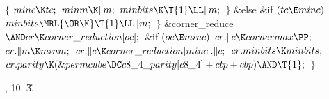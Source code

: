 ${}\{{}$\1\6
${}\\{minc}\K\\{tc};{}$\6
${}\\{minm}\K\|m;{}$\6
${}\\{minbits}\K\T{1}\LL\|m;{}$\6
\4${}\}{}$\2\6
\&{else} \&{if} ${}(\\{tc}\E\\{minc}){}$\1\5
${}\\{minbits}\MRL{{\OR}{\K}}\T{1}\LL\|m;{}$\2\6
\4${}\}{}$\2\7
\&{corner\_reduce} ${}{\AND}\\{cr}\K\\{corner\_reduction}[\\{oc}];{}$\7
\&{if} ${}(\\{oc}\E\\{minc}){}$\1\5
${}\\{cr}.\|c\K\\{cornermax}\PP;{}$\2\6
${}\\{cr}.\|m\K\\{minm};{}$\6
${}\\{cr}.\|c\K\\{corner\_reduction}[\\{minc}].\|c;{}$\6
${}\\{cr}.\\{minbits}\K\\{minbits};{}$\6
${}\\{cr}.\\{parity}\K(\&{permcube}\DC\\{c8\_4\_parity}[\\{c8\_4}]+\\{ctp}+%
\\{cbp})\AND\T{1};{}$\6
\4${}\}{}$\2\2\2\par
{}, 10.
\U3.\fi

